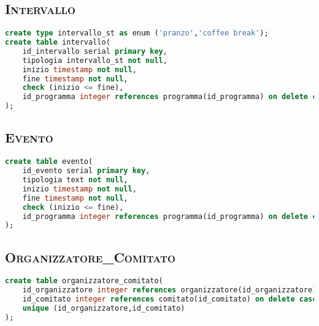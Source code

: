\subsection{\textsc{Intervallo}}
\begin{lstlisting}[language=SQL,style=mystyle, caption={Tabella: Programma}]
create type intervallo_st as enum ('pranzo','coffee break');
create table intervallo(
    id_intervallo serial primary key,
    tipologia intervallo_st not null,
    inizio timestamp not null,
    fine timestamp not null,
    check (inizio <= fine), 
    id_programma integer references programma(id_programma) on delete cascade not null
);
\end{lstlisting}
\subsection{\textsc{Evento}}
\begin{lstlisting}[language=SQL,style=mystyle, caption={Tabella: Evento}]
create table evento(
    id_evento serial primary key,
    tipologia text not null,
    inizio timestamp not null,
    fine timestamp not null,
    check (inizio <= fine), 
    id_programma integer references programma(id_programma) on delete cascade not null
);
\end{lstlisting}
\subsection{\textsc{Organizzatore\_Comitato}}
\begin{lstlisting}[language=SQL,style=mystyle, caption={Tabella: Organizzatore\_Comitato}]
create table organizzatore_comitato(
    id_organizzatore integer references organizzatore(id_organizzatore) on delete cascade,
    id_comitato integer references comitato(id_comitato) on delete cascade,
    unique (id_organizzatore,id_comitato) 
);
\end{lstlisting}